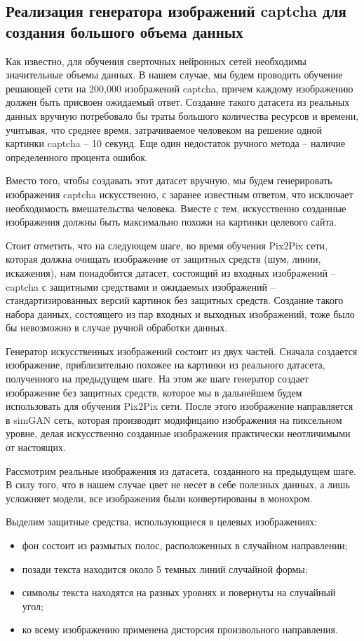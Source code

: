 \subsection{Реализация генератора изображений captcha для создания большого объема данных}
Как известно, для обучения сверточных нейронных сетей необходимы значительные объемы данных. В нашем случае, мы будем проводить обучение решающей сети на 200,000 изображений captcha, причем каждому изображению должен быть присвоен ожидаемый ответ. Создание такого датасета из реальных данных вручную потребовало бы траты большого количества ресурсов и времени, учитывая, что среднее время, затрачиваемое человеком на решение одной картинки captcha – 10 секунд. Еще один недостаток ручного метода – наличие определенного процента ошибок.

Вместо того, чтобы создавать этот датасет вручную, мы будем генерировать изображения captcha искусственно, с заранее известным ответом, что исключает необходимость вмешательства человека. Вместе с тем, искусственно созданные изображения должны быть максимально похожи на картинки целевого сайта.

Стоит отметить, что на следующем шаге, во время обучения Pix2Pix сети, которая должна очищать изображение от защитных средств (шум, линии, искажения), нам понадобится датасет, состоящий из входных изображений – captcha с защитными средствами и ожидаемых изображений – стандартизированных версий картинок без защитных средств. Создание такого набора данных, состоящего из пар входных и выходных изображений, тоже было бы невозможно в случае ручной обработки данных.

Генератор искусственных изображений состоит из двух частей. Сначала создается изображение, приблизительно похожее на картинки из реального датасета, полученного на предыдущем шаге. На этом же шаге генератор создает изображение без защитных средств, которое мы в дальнейшем будем использовать для обучения Pix2Pix сети. После этого изображение направляется в simGAN сеть, которая производит модифицаию изображения на пиксельном уровне, делая искусственно созданные изображения практически неотличимыми от настоящих.

Рассмотрим реальные изображения из датасета, созданного на предыдущем шаге. В силу того, что в нашем случае цвет не несет в себе полезных данных, а лишь усложняет модели, все изображения были конвертированы в монохром.

Выделим защитные средства, использующиеся в целевых изображениях:
\begin{itemize}
	\item фон состоит из размытых полос, расположенных в случайном направлении;
	\item позади текста находится около 5 темных линий случайной формы;
	\item символы текста находятся на разных уровнях и повернуты на случайный угол;
	\item ко всему изображению применена дисторсия произвольного направления.
	
\end{itemize}

